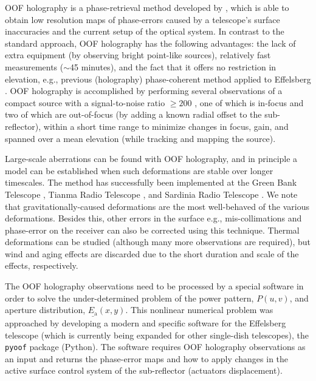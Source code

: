 \documentclass[
    ]
    {aa}
\begin{document}
    OOF holography is a phase-retrieval method developed by \citet{2007A&A...465..679N}, which is able to obtain low resolution maps of phase-errors caused by a telescope's surface inaccuracies and the current setup of the optical system. 
    In contrast to the standard approach, OOF holography has the following advantages: the lack of extra equipment (by observing bright point-like sources), relatively fast measurements ($\sim$45 minutes), and the fact that it offers no restriction in elevation, e.g., previous (holography) phase-coherent method applied to Effelsberg \citep{kesteveen2001effelsberg}.
    OOF holography is accomplished by performing several observations of a compact source with a signal-to-noise ratio $\geq200$ \citep[suggested by][]{2007A&A...465..679N}, one of which is in-focus and two of which are out-of-focus (by adding a known radial offset to the sub-reflector), within a short time range to minimize changes in focus, gain, and spanned over a mean elevation (while tracking and mapping the source).

    Large-scale aberrations can be found with OOF holography, and in principle a model can be established when such deformations are stable over longer timescales. The method has successfully been implemented at the Green Bank Telescope \citep{2007A&A...465..685N}, Tianma Radio Telescope \citep{2018ITAP...66.2044D}, and Sardinia Radio Telescope \citep{2020SPIE11445E..6GB}.
    We note that gravitationally-caused deformations are the most well-behaved of the various deformations. Besides this, other errors in the surface e.g., mis-collimations and phase-error on the receiver can also be corrected using this technique. Thermal deformations can be studied (although many more observations are required), but wind and aging effects are discarded due to the short duration and scale of the effects, respectively.

    The OOF holography observations need to be processed by a special software in order to solve the under-determined problem of the power pattern, $P(u, v)$, and aperture distribution, $\underline{E_\text{a}}(x, y)$. This nonlinear numerical problem was approached by developing a modern and specific software for the Effelsberg telescope (which is currently being expanded for other single-dish telescopes), the \texttt{pyoof} package (Python). The software requires OOF holography observations as an input and returns the phase-error maps and how to apply changes in the active surface control system of the sub-reflector (actuators displacement).
\end{document}
